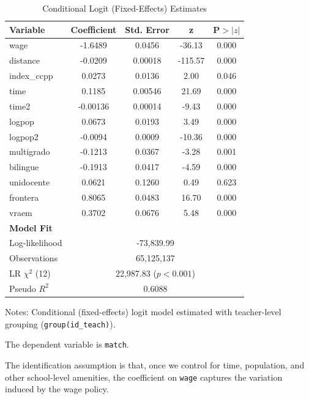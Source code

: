 \documentclass{article}
\begin{document}
\begin{table}[H]
\centering
\caption{Conditional Logit (Fixed-Effects) Estimates}
\label{tab:clogit_results}
\begin{threeparttable}
\begin{tabular}{lcccc}
\toprule
Variable & Coefficient & Std. Error & z & P$>|z|$ \\
\midrule
wage            & -1.6489  & 0.0456 & -36.13 & 0.000 \\
distance        & -0.0209  & 0.00018 & -115.57 & 0.000 \\
index\_ccpp     &  0.0273  & 0.0136 & 2.00 & 0.046 \\
time            &  0.1185  & 0.00546 & 21.69 & 0.000 \\
time2           & -0.00136 & 0.00014 & -9.43 & 0.000 \\
logpop          &  0.0673  & 0.0193 & 3.49 & 0.000 \\
logpop2         & -0.0094  & 0.0009 & -10.36 & 0.000 \\
multigrado      & -0.1213  & 0.0367 & -3.28 & 0.001 \\
bilingue        & -0.1913  & 0.0417 & -4.59 & 0.000 \\
unidocente      &  0.0621  & 0.1260 & 0.49  & 0.623 \\
frontera        &  0.8065  & 0.0483 & 16.70 & 0.000 \\
vraem           &  0.3702  & 0.0676 & 5.48  & 0.000 \\
\midrule
\textbf{Model Fit} & & & & \\
Log-likelihood   & \multicolumn{4}{c}{-73,839.99} \\
Observations     & \multicolumn{4}{c}{65,125,137} \\
LR $\chi^2$ (12) & \multicolumn{4}{c}{22,987.83 ($p<0.001$)} \\
Pseudo $R^2$     & \multicolumn{4}{c}{0.6088} \\
\bottomrule
\end{tabular}
\begin{tablenotes}
\footnotesize
\item Notes: Conditional (fixed-effects) logit model estimated with teacher-level grouping (\texttt{group(id\_teach)}). 
\item The dependent variable is \texttt{match}.
\end{tablenotes}
\end{threeparttable}
\end{table}

The identification assumption is that, once we control for time, population, and other school-level amenities, the coefficient on \texttt{wage} captures the variation induced by the wage policy. \\
\end{document}
